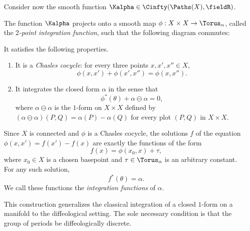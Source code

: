 \begin{article}
  Consider now the smooth function $\Kalpha \in \Cinfty(\Paths(X),\fieldR)$.
  
  \begin{proposition}[2]
    The function $\Kalpha$ projects onto a smooth map
    $\phi: X \times X \to \Torus_\alpha$,
    called the \emph{$2$-point integration function},
    such that the following diagram commutes:
    \begin{center}
    \end{center}
    It satisfies the following properties.
    \begin{enumerate}
      \item It is a \emph{Chasles cocycle}:
      for every three points $x,x',x'' \in X$,
      \[
        \phi(x,x') + \phi(x',x'') = \phi(x,x'').
        \]%
      \item It integrates the closed form $\alpha$ in the sense that
      \[
        \phi^*(\theta) + \alpha \ominus \alpha = 0,
        \]%
      where $\alpha \ominus \alpha$ is the $1$-form on $X \times X$ defined by
      $(\alpha \ominus \alpha)(P,Q) = \alpha(P) - \alpha(Q)$
      for every plot $(P,Q)$ in $X \times X$.
    \end{enumerate}
  \end{proposition}
  
  Since $X$ is connected and $\phi$ is a Chasles cocycle,
  the solutions $f$ of the equation $\phi(x,x') = f(x') - f(x)$
  are exactly the functions of the form
  \[
    f(x) = \phi(x_0,x) + \tau,
    \]%
  where $x_0 \in X$ is a chosen basepoint and $\tau \in \Torus_\alpha$ is an
  arbitrary constant.
  For any such solution,
  \[
    f^*(\theta) = \alpha.
    \]%
  We call these functions the \emph{integration functions} of $\alpha$.
  
  This construction generalizes the classical integration of a closed $1$-form
  on a manifold to the diffeological setting.
  The sole necessary condition is that the group of periods be
  diffeologically discrete.
\end{article}

